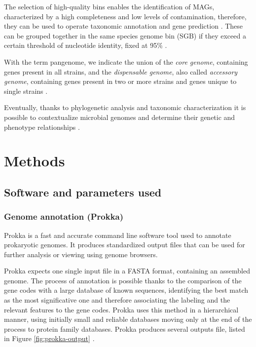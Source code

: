 \documentclass[a4paper,titlepage, oneside]{book}
\begin{document}
The selection of high-quality bins enables the identification of MAGs, characterized by a high completeness and low levels of contamination, therefore, they can be used to operate taxonomic annotation and gene prediction \cite{MAG2}. These can be grouped together in the same species genome bin (SGB) if they exceed a certain threshold of nucleotide identity, fixed at 95\% \cite{SGB2, SGB}.



With the term pangenome, we indicate the union of the \textit{core genome}, containing genes present in all strains, and the \textit{dispensable genome}, also called \textit{accessory genome}, containing genes present in two or more strains and genes unique to single strains \cite{Medini}.

Eventually, thanks to phylogenetic analysis and taxonomic characterization it is possible to contextualize microbial genomes and determine their genetic and phenotype relationships \cite{Phylo}.




\chapter{Methods}
\section{Software and parameters used}
\subsection{Genome annotation (Prokka)}

Prokka is a fast and accurate command line software tool used to annotate prokaryotic genomes.  It produces standardized output files that can be used for further analysis or viewing using genome browsers.

Prokka expects one single input file in a FASTA format, containing an assembled genome. The process of annotation is possible thanks to the comparison of the gene codes with a large database of known sequences, identifying the best match as the most significative one and therefore associating the labeling and the relevant features to the gene codes. Prokka uses this method in a hierarchical manner, using initially small and reliable databases moving only at the end of the process to protein family databases.
Prokka produces several outputs file, listed in Figure \ref{fig:prokka-output}  \cite{Prokka}.
\end{document}
